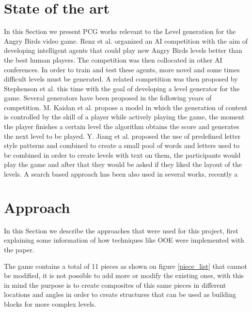 \documentclass[conference]{IEEEtran}
\begin{document}
    
    \section{State of the art}
    \label{SoA}
    In this Section we present PCG works relevant to the Level generation for the
    Angry Birds video game. Renz et al. \cite{Renz, Renz2015TheAB} organized an AI
    competition with the aim of developing intelligent agents that could play new
    Angry Birds levels better than the best human players. The competition was then
    collocated in other AI conferences. In order to train and test these agents,
    more novel and some times difficult levels must be generated. A related
    competition was then proposed by Stephenson et al. \cite{Stephenson} this time
    with the goal of developing a level generator for the game. Several generators
    have been proposed in the following years of competition. M. Kaidan et al.
    \cite{Kaidan2015} propose a model in which the generation of content is
    controlled by the skill of a player while actively playing the game, the moment
    the player finishes a certain level the algorithm obtains the score and
    generates the next level to be played. Y. Jiang et al. \cite{Jiang2017} proposed
    the use of predefined letter style patterns and combined to create a small pool
    of words and letters used to be combined in order to create levels with text on
    them, the participants would play the game and after that they would be asked if
    they liked the layout of the levels. A search based approach has been also used
    in several works, recently a   
    
    \section{Approach}
    
    In this Section we describe the approaches that were used for this project, first 
    explaining some information of how techniques like OOE were implemented with the paper.
    
    The game contains a total of 11 pieces as shown on figure \ref{piece_list} that
    cannot be modified, it is not possible to add more or modify the existing ones,
    with this in mind the purpose is to create composites of this same pieces in
    different locations and angles in order to create structures that can be used as
    building blocks for more complex levels. 
    
\end{document}

